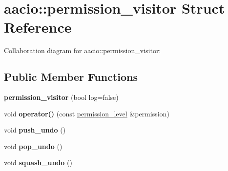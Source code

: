 \hypertarget{structaacio_1_1permission__visitor}{}\section{aacio\+:\+:permission\+\_\+visitor Struct Reference}
\label{structaacio_1_1permission__visitor}


Collaboration diagram for aacio\+:\+:permission\+\_\+visitor\+:
\subsection*{Public Member Functions}
\begin{DoxyCompactItemize}
\item 
\mbox{\label{structaacio_1_1permission__visitor_af66ba281a6cefbd35cc2d318cbdd5157}} 
{\bfseries permission\+\_\+visitor} (bool log=false)
\item 
\mbox{\label{structaacio_1_1permission__visitor_a82267f32d27770e8a23a7d72d847c03b}} 
void {\bfseries operator()} (const \mbox{\hyperlink{structaacio_1_1permission__level}{permission\+\_\+level}} \&permission)
\item 
\mbox{\label{structaacio_1_1permission__visitor_a94de4d3cca1ce36e319f884cbddf8cfe}} 
void {\bfseries push\+\_\+undo} ()
\item 
\mbox{\label{structaacio_1_1permission__visitor_af983cbb6f99e4333ed200d3fde54b71c}} 
void {\bfseries pop\+\_\+undo} ()
\item 
\mbox{\label{structaacio_1_1permission__visitor_a8ebf160e81e64fc88d07df18b7ca55b4}} 
void {\bfseries squash\+\_\+undo} ()
\end{DoxyCompactItemize}
